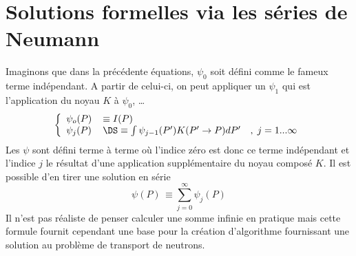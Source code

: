 \section{Solutions formelles via les séries de Neumann}
Imaginons que dans la précédente équations, $\psi_0$ soit défini comme le fameux terme indépendant. 
A partir de celui-ci, on peut appliquer un $\psi_1$ qui est l'application du noyau $K$ à $\psi_0$, 
\dots 
\begin{equation}
\left\{\begin{array}{ll}
{\psi _o}(P) &\equiv I(P)\\
{\psi _j}(P)\, &\DS\equiv \int   {\psi _{j - 1}}(P')K(P' \to P)dP'\quad ,\;j = 1...\infty 
\end{array}\right.
\end{equation}
Les $\psi$ sont défini terme à terme où l'indice zéro est donc ce terme indépendant et l'indice 
$j$ le résultat d'une application supplémentaire du noyau composé $K$. Il est possible d'en tirer 
une solution en série
\begin{equation}
\psi (P)\, \equiv \sum\limits_{j = 0}^\infty    {\psi _j}(P)
\end{equation}
Il n'est pas réaliste de penser calculer une somme infinie en pratique mais cette
formule fournit cependant une base pour la création d'algorithme fournissant une
solution au problème de transport de neutrons.
